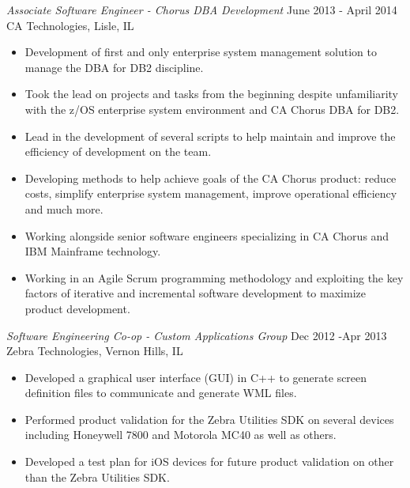 \documentclass[margin]{res}
\newcommand{\tab}{\hspace*{2em}}
\begin{document}
\begin{resume}
{\sl Associate Software Engineer - Chorus DBA Development} \hfill June 2013 - April 2014\\
	CA Technologies, Lisle, IL		\tab	\tab\tab\tab\tab\tab\tab\tab			
	\begin{itemize}  \itemsep -2pt %
	\item Development of first and only enterprise system management solution to manage the DBA for DB2 discipline.
	\item Took the lead on projects and tasks from the beginning despite unfamiliarity with the z/OS enterprise system environment and CA Chorus DBA for DB2.
	\item Lead in the development of several scripts to help maintain and improve the efficiency of development on the team.
	\item Developing methods to help achieve goals of the CA Chorus product: reduce costs, simplify enterprise system management, improve operational efficiency and much more.
	\item Working alongside senior software engineers specializing in CA Chorus and IBM Mainframe technology.
	\item Working in an Agile Scrum programming methodology and exploiting the key factors of iterative and incremental software development to maximize product development.
	\end{itemize}

{\sl Software Engineering Co-op - Custom Applications Group} \hfill Dec 2012 -Apr 2013\\
    Zebra Technologies, Vernon Hills, IL		\tab	\tab\tab\tab\tab\tab\tab\tab			
 	\begin{itemize}  \itemsep -2pt %
	\item Developed a graphical user interface (GUI) in C++ to generate screen definition files to communicate and generate WML files.
	\item Performed product validation for the Zebra Utilities SDK on several devices including Honeywell 7800 and Motorola MC40 as well as others.
	\item Developed a test plan for iOS devices for future product validation on other than the Zebra Utilities SDK.
	\end{itemize}


\end{resume}
\end{document}
